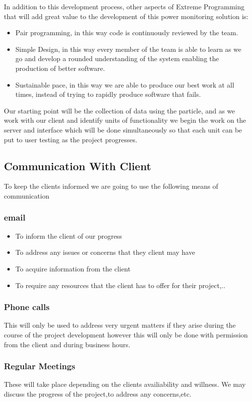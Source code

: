 \documentclass[a4paper,12pt]{article}
\begin{document}
In addition to this development process, other aspects of Extreme Programming that will add great value to the development of this power monitoring solution is:
\begin{itemize}
\item Pair programming, in this way code is continuously reviewed by the team.
\item Simple Design, in this way every member of the team is able to learn as we go and develop a rounded understanding of the system enabling the production of better software.
\item Sustainable pace, in this way we are able to produce our best work at all times, instead of trying to rapidly produce software that fails.
\end{itemize}
Our starting point will be the collection of data using the particle, and as we work with our client and identify units of functionality we begin the work on the server and interface which will be done simultaneously so that each unit can be put to user testing as the project progresses.
\subsection{Communication With Client}
To keep the clients informed we are going to use the following means of communication
\subsubsection{email}
\begin{itemize}
\item To inform the client of our progress
\item To address any issues or concerns that they client may have
\item To acquire information from the client
\item To require any resources that the client has to offer for their project,..
\end{itemize}

\subsubsection{Phone calls}
 This will only be used to address very urgent matters if they arise during the course of the project development 
 however this will only be done with permission from the client and during business hours.
 
\subsubsection{Regular Meetings}	 
These will take place depending on the clients availiability and willness.
We may discuss the progress of the project,to address any concerns,etc.
\end{document}
